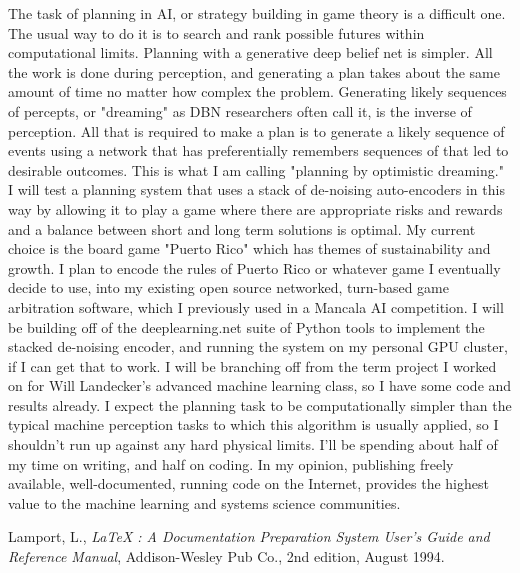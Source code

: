 \documentclass[11pt]{article}
\begin{document}
The task of planning in AI, or strategy building in game theory is a difficult one. The usual way to do it is to search and rank possible futures within computational limits. Planning with a generative deep belief net is simpler. All the work is done during perception, and generating a plan takes about the same amount of time no matter how complex the problem. Generating likely sequences of percepts, or "dreaming" as DBN researchers often call it, is the inverse of perception. All that is required to make a plan is to generate a likely sequence of events using a network that has preferentially remembers sequences of that led to desirable outcomes. This is what I am calling "planning by optimistic dreaming." I will test a planning system that uses a stack of de-noising auto-encoders in this way by allowing it to play a game where there are appropriate risks and rewards and a balance between short and long term solutions is optimal. My current choice is the board game "Puerto Rico" which has themes of sustainability and growth. I plan to encode the rules of Puerto Rico or whatever game I eventually decide to use, into my existing open source networked, turn-based game arbitration software, which I previously used in a Mancala AI competition. I will be building off of the deeplearning.net suite of Python tools to implement the stacked de-noising encoder, and running the system on my personal GPU cluster, if I can get that to work. I will be branching off from the term project I worked on for Will Landecker's advanced machine learning class, so I have some code and results already. I expect the planning task to be computationally simpler than the typical machine perception tasks to which this algorithm is usually applied, so I shouldn't run up against any hard physical limits. I'll be spending about half of my time on writing, and half on coding. In my opinion, publishing freely available, well-documented, running code on the Internet, provides the highest value to the machine learning and systems science communities.

\begin{thebibliography}{99}
 Lamport, L., {\it LaTeX : A Documentation
 Preparation System User's Guide and Reference Manual}, Addison-Wesley 
 Pub Co., 2nd edition, August 1994.
\end{thebibliography}


\end{document}
